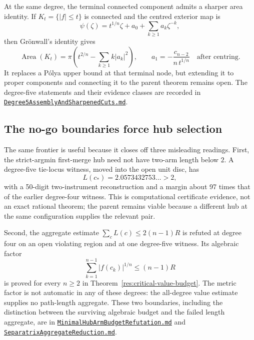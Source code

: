 \documentclass[11pt]{article}
\begin{document}
At the same degree, the terminal connected component admits a sharper area
identity.  If $K_t=\{|f|\le t\}$ is connected and the centred exterior map is
\[
 \psi(\zeta)=t^{1/n}\zeta+a_0+
 \sum_{k\ge1}a_k\zeta^{-k},
\]
then Gr\"onwall's identity gives
\[
 \operatorname{Area}(K_t)=\pi\left(t^{2/n}-
 \sum_{k\ge1}k|a_k|^2\right),
 \qquad
 a_1=-\frac{c_{n-2}}{n\,t^{1/n}}
 \quad\text{after centring}.
\]
It replaces a P\'olya upper bound at that terminal node, but extending it to
proper components and connecting it to the parent theorem remains open.  The
degree-five statements and their evidence classes are recorded in
\href{https://github.com/wcook04/plectis-erdos/blob/f214a6b45528dc5eefe20ffadc35f2e981627d4c/research_corpus/Erdos1041/Degree5AssemblyAndSharpenedCuts.md}{\texttt{Degree5AssemblyAndSharpenedCuts.md}}.

\subsection*{The no-go boundaries force hub selection}

The same frontier is useful because it closes off three misleading readings.
First, the strict-argmin first-merge hub need not have two-arm length below
$2$.  A degree-five tie-locus witness, moved into the open unit disc, has
\[
 L(c_*)=2.0573432753\ldots>2,
\]
with a 50-digit two-instrument reconstruction and a margin about 97 times
that of the earlier degree-four witness.  This is computational certificate
evidence, not an exact rational theorem; the parent remains viable because a
different hub at the same configuration supplies the relevant pair.

Second, the aggregate estimate
$\sum_cL(c)\le2(n-1)R$ is refuted at degree four on an open violating region
and at one degree-five witness.  Its algebraic factor
\[
 \sum_{k=1}^{n-1}|f(c_k)|^{1/n}\le(n-1)R
\]
is proved for every $n\ge2$ in Theorem~\ref{res:critical-value-budget}.
The metric factor is not automatic in any of these degrees: the all-degree
value estimate supplies no path-length aggregate.
These two boundaries, including the distinction between the surviving
algebraic budget and the failed length aggregate, are in
\href{https://github.com/wcook04/plectis-erdos/blob/f214a6b45528dc5eefe20ffadc35f2e981627d4c/research_corpus/Erdos1041/MinimalHubArmBudgetRefutation.md}{\texttt{MinimalHubArmBudgetRefutation.md}}
and
\href{https://github.com/wcook04/plectis-erdos/blob/f214a6b45528dc5eefe20ffadc35f2e981627d4c/research_corpus/Erdos1041/SeparatrixAggregateReduction.md}{\texttt{SeparatrixAggregateReduction.md}}.
\end{document}
